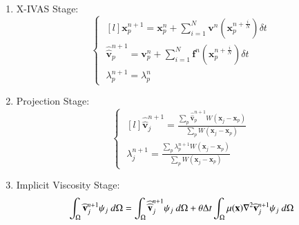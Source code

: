  \begin{program}[htbp]
	{\footnotesize
	\begin{enumerate}
	    \item X-IVAS Stage:
	    \begin{equation}
	      \left\{\;
	      \begin{matrix}[l]
		  \mathbf{x}^{n+1}_{p}=\mathbf{x}^{n}_{p}+ \sum_{i=1}^{N} \mathbf{v}^{n}(\mathbf{x}^{n+\frac{i}{N}}_{p}) \delta t \\
		  \widehat{\widehat{\mathbf{v}}}^{n+1}_{p}=\mathbf{v}^{n}_{p}+ \sum_{i=1}^{N} \mathbf{f}^{n} (\mathbf{x}^{n+\frac{i}{N}}_{p})  \delta t \\
		  \lambda_p^{n+1} =\lambda_p^n
	      \end{matrix}\;
	      \right.
	      \label{Step2step2fluids}
	    \end{equation}
	    \item Projection Stage:
	    \begin{equation}\label{Step3b2fluids}
	    \left\{\;
	      \begin{matrix}[l]
	      \displaystyle \widehat{\widehat{\mathbf{v}}}^{n+1}_{j}=\frac{\sum_{p} \widehat{\widehat{\mathbf{v}}}^{n+1}_{p} W(\mathbf{x}_{j}-\mathbf{x}_{p})}{\sum_{p} W(\mathbf{x}_{j}-\mathbf{x}_{p})} \\
	      \displaystyle \lambda^{n+1}_{j}=\frac{\sum_{p} \lambda^{n+1}_{p} W(\mathbf{x}_{j}-\mathbf{x}_{p})}{\sum_{p} W(\mathbf{x}_{j}-\mathbf{x}_{p})}
	      \end{matrix}\;
	      \right.
	    \end{equation}
	    \item Implicit Viscosity Stage:
	     \begin{eqnarray}\label{Step4a2fluids}
	      \displaystyle \int_{\Omega} \widehat{\mathbf{v}}^{n+1}_{j}\psi_j\ d\Omega =\int_{\Omega} \widehat{\widehat{\mathbf{v}}}^{n+1}_{j}\psi_j\ d\Omega + \theta \Delta t \int_{\Omega} \mu(\mathbf{x}) \nabla^{2}\widehat{\mathbf{v}}^{n+1}_{j} \psi_j\ d\Omega
	      \end{eqnarray}


\end{enumerate}}
\end{program}
